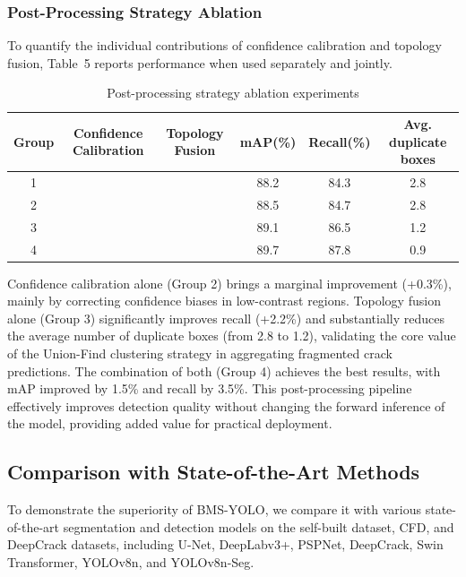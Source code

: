 \documentclass[twocolumn]{sn-jnl}
\begin{document}
	\subsubsection{Post-Processing Strategy Ablation}
	To quantify the individual contributions of confidence calibration and topology fusion, Table~5 reports performance when used separately and jointly.
	
	\begin{table}[htbp]
		\centering
		\caption{Post-processing strategy ablation experiments}
		\begin{tabular}{cccccc}
			\toprule
			Group & Confidence Calibration & Topology Fusion & mAP(\%) & Recall(\%) & Avg. duplicate boxes \\
			\midrule
			1 & & & 88.2 & 84.3 & 2.8 \\
			2 & \checkmark & & 88.5 & 84.7 & 2.8 \\
			3 & & \checkmark & 89.1 & 86.5 & 1.2 \\
			4 & \checkmark & \checkmark & 89.7 & 87.8 & 0.9 \\
			\bottomrule
		\end{tabular}
		\label{tab:post}
	\end{table}
	
	Confidence calibration alone (Group 2) brings a marginal improvement (+0.3\%), mainly by correcting confidence biases in low-contrast regions. Topology fusion alone (Group 3) significantly improves recall (+2.2\%) and substantially reduces the average number of duplicate boxes (from 2.8 to 1.2), validating the core value of the Union-Find clustering strategy in aggregating fragmented crack predictions. The combination of both (Group 4) achieves the best results, with mAP improved by 1.5\% and recall by 3.5\%. This post-processing pipeline effectively improves detection quality without changing the forward inference of the model, providing added value for practical deployment.
	
	\subsection{Comparison with State-of-the-Art Methods}
	To demonstrate the superiority of BMS-YOLO, we compare it with various state-of-the-art segmentation and detection models on the self-built dataset, CFD, and DeepCrack datasets, including U-Net, DeepLabv3+, PSPNet, DeepCrack, Swin Transformer, YOLOv8n, and YOLOv8n-Seg.
	
\end{document}
